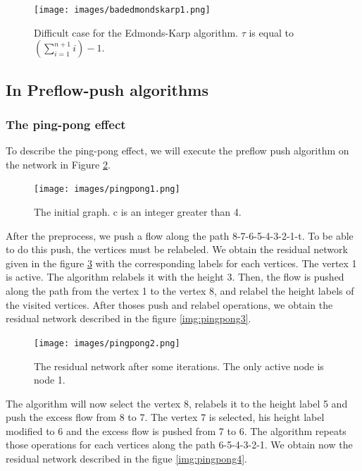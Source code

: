 \begin{figure}
\centering
\texttt{[image: images/badedmondskarp1.png]}
\caption{Difficult case for the Edmonds-Karp algorithm. $\tau$ is equal to $(\sum\limits_{i=1}^{n+1} i) - 1$.}
\label{img:badedmondskarp}
\end{figure}

\subsection{In Preflow-push algorithms}

\subsubsection{The ping-pong effect}

To describe the ping-pong effect, we will execute the preflow push algorithm on the network in Figure \ref{img:pingpong1}.

\begin{figure}[H]
\centering
\texttt{[image: images/pingpong1.png]}
\caption{The initial graph. c is an integer greater than 4.}
\label{img:pingpong1}
\end{figure}

After the preprocess, we push a flow along the path 8-7-6-5-4-3-2-1-t. To be able to do this push, the vertices must be relabeled. We obtain the residual network given in the figure \ref{img:pingpong2} with the corresponding labels for each vertices. The vertex 1 is active. The algorithm relabels it with the height 3. Then, the flow is pushed along the path from the vertex 1 to the vertex 8, and relabel the height labels of the visited vertices. After thoses push and relabel operations, we obtain the residual network described in the figure \ref{img:pingpong3}.

\begin{figure}[H]
\centering
\texttt{[image: images/pingpong2.png]}
\caption{The residual network after some iterations. The only active node is node 1.}
\label{img:pingpong2}
\end{figure}

The algorithm will now select the vertex 8, relabels it to the height label 5 and push the excess flow from 8 to 7. The vertex 7 is selected, his height label modified to 6 and the excess flow is pushed from 7 to 6. The algorithm repeats those operations for each vertices along the path 6-5-4-3-2-1. We obtain now the residual network described in the figue \ref{img:pingpong4}.

